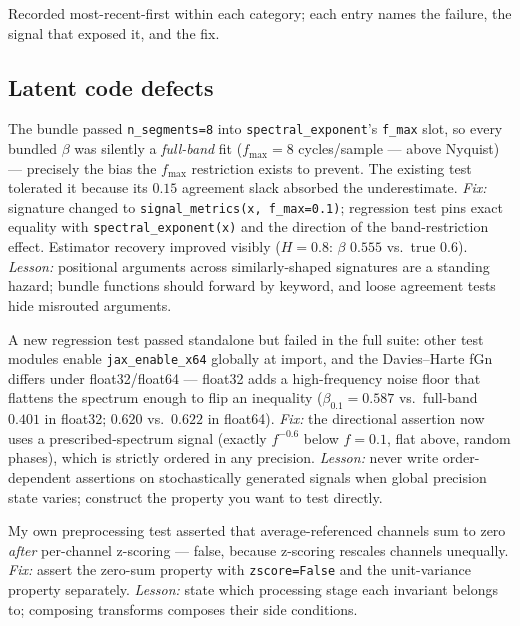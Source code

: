 \documentclass[11pt]{article}
\begin{document}
Recorded most-recent-first within each category; each entry names the failure,
the signal that exposed it, and the fix.

\subsection{Latent code defects}

\begin{description}[leftmargin=1.6em,style=nextline]
  \item[\texttt{signal\_metrics} argument misrouting.]
  The bundle passed \texttt{n\_segments=8} into \texttt{spectral\_exponent}'s
  \texttt{f\_max} slot, so every bundled $\beta$ was silently a \emph{full-band}
  fit ($f_{\max}=8$ cycles/sample --- above Nyquist) --- precisely the bias the
  $f_{\max}$ restriction exists to prevent. The existing test tolerated it
  because its $0.15$ agreement slack absorbed the underestimate. \emph{Fix:}
  signature changed to \texttt{signal\_metrics(x, f\_max=0.1)}; regression test
  pins exact equality with \texttt{spectral\_exponent(x)} and the direction of
  the band-restriction effect. Estimator recovery improved visibly
  ($H{=}0.8$: $\beta$ $0.555$ vs.\ true $0.6$). \emph{Lesson:} positional
  arguments across similarly-shaped signatures are a standing hazard; bundle
  functions should forward by keyword, and loose agreement tests hide
  misrouted arguments.

  \item[Suite-order-dependent test failure (global \texttt{x64}).]
  A new regression test passed standalone but failed in the full suite:
  other test modules enable \texttt{jax\_enable\_x64} globally at import,
  and the Davies--Harte fGn differs under float32/float64 --- float32 adds a
  high-frequency noise floor that flattens the spectrum enough to flip an
  inequality ($\beta_{0.1} = 0.587$ vs.\ full-band $0.401$ in float32;
  $0.620$ vs.\ $0.622$ in float64). \emph{Fix:} the directional assertion now
  uses a prescribed-spectrum signal (exactly $f^{-0.6}$ below $f{=}0.1$, flat
  above, random phases), which is strictly ordered in any precision.
  \emph{Lesson:} never write order-dependent assertions on stochastically
  generated signals when global precision state varies; construct the
  property you want to test directly.

  \item[Asserting an invariant in the wrong domain.]
  My own preprocessing test asserted that average-referenced channels sum to
  zero \emph{after} per-channel z-scoring --- false, because z-scoring
  rescales channels unequally. \emph{Fix:} assert the zero-sum property with
  \texttt{zscore=False} and the unit-variance property separately.
  \emph{Lesson:} state which processing stage each invariant belongs to;
  composing transforms composes their side conditions.
\end{description}
\end{document}
